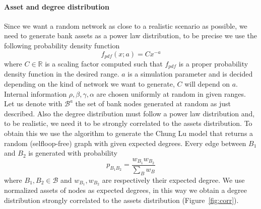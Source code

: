 \documentclass[a4paper, 11pt]{article}
\begin{document}
\paragraph{Asset and degree distribution} %
Since we want a random network as close to a realistic scenario as possible, we need to generate bank assets as a power law distribution, to be precise we use the following probability density function
$$ f_{pdf}(x;a) = C x^{-a} $$
where $C \in \mathbb{R}$ is a scaling factor computed such that $f_{pdf}$ is a proper probability density function in the desired range. $a$ is a simulation parameter and is decided depending on the kind of network we want to generate, $C$ will depend on $a$. Internal information $\rho,\beta,\gamma,\alpha$ are chosen uniformly at random in given ranges. Let us denote with $\mathcal{B}^a$ the set of bank nodes generated at random as just described. Also the degree distribution must follow a power law distribution and, to be realistic, we need it to be strongly correlated to the assets distribution. To obtain this we use the algorithm to generate the Chung Lu model \cite{ChungLu} that returns a random (selfloop-free) graph with given expected degrees. Every edge between $B_1$ and $B_2$ is generated with probability 
$$ p_{B_1B_2} = \frac{w_{B_1}w_{B_2}}{\sum_B w_B} $$
where $B_1,B_2 \in \mathcal{B}$ and $w_{B_1}, w_{B_2}$ are respectively their expected degree. We use normalized assets of nodes as expected degrees, in this way we obtain a degree distribution strongly correlated to the assets distribution (Figure~\ref{fig:corr}).
\end{document}
